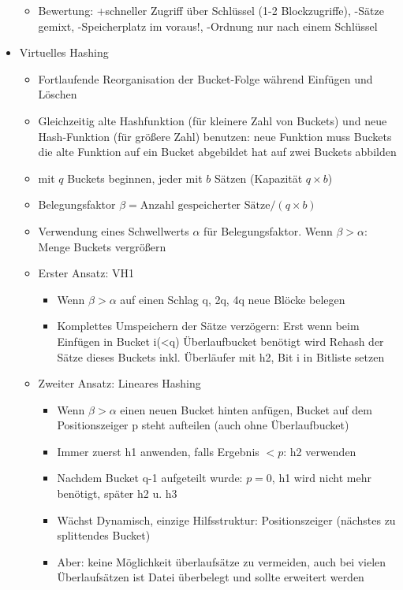 \documentclass[a4paper, 12pt]{scrartcl}
\begin{document}
\begin{itemize}
\begin{itemize}
			\item
				Bewertung: +schneller Zugriff über Schlüssel (1-2 Blockzugriffe), -Sätze gemixt, -Speicherplatz im voraus!, -Ordnung nur nach einem Schlüssel
		\end{itemize}
	\item
		Virtuelles Hashing
		\begin{itemize}
			\item
				Fortlaufende Reorganisation der Bucket-Folge während Einfügen und Löschen
			\item
				Gleichzeitig alte Hashfunktion (für kleinere Zahl von Buckets) und neue Hash-Funktion (für größere Zahl) benutzen: neue Funktion muss Buckets die alte Funktion auf ein Bucket abgebildet hat auf zwei Buckets abbilden
			\item
				mit $q$ Buckets beginnen, jeder mit $b$ Sätzen (Kapazität $q\times b$)
			\item
				Belegungsfaktor $\beta = \text{Anzahl gespeicherter Sätze}/(q\times b)$
			\item
				Verwendung eines Schwellwerts $\alpha$ für Belegungsfaktor. Wenn $\beta > \alpha$: Menge Buckets vergrößern
			\item
				Erster Ansatz: VH1
				\begin{itemize}
					\item
						Wenn $\beta > \alpha$ auf einen Schlag q, 2q, 4q neue Blöcke belegen
					\item
						Komplettes Umspeichern der Sätze verzögern: Erst wenn beim Einfügen in Bucket i(<q) Überlaufbucket benötigt wird Rehash der Sätze dieses Buckets inkl. Überläufer mit h2, Bit i in Bitliste setzen
				\end{itemize}
			\item
				Zweiter Ansatz: Lineares Hashing
				\begin{itemize}
					\item Wenn $\beta > \alpha$ einen neuen Bucket hinten anfügen, Bucket auf dem Positionszeiger p steht aufteilen (auch ohne Überlaufbucket)
					\item
						Immer zuerst h1 anwenden, falls Ergebnis $< p$: h2 verwenden
					\item
						Nachdem Bucket q-1 aufgeteilt wurde: $p=0$, h1 wird nicht mehr benötigt, später h2 u. h3
					\item Wächst Dynamisch, einzige Hilfsstruktur: Positionszeiger (nächstes zu splittendes Bucket)
					\item
						Aber: keine Möglichkeit überlaufsätze zu vermeiden, auch bei vielen Überlaufsätzen ist Datei überbelegt und sollte erweitert werden
				\end{itemize}
		\end{itemize}
\end{itemize}
\end{document}
